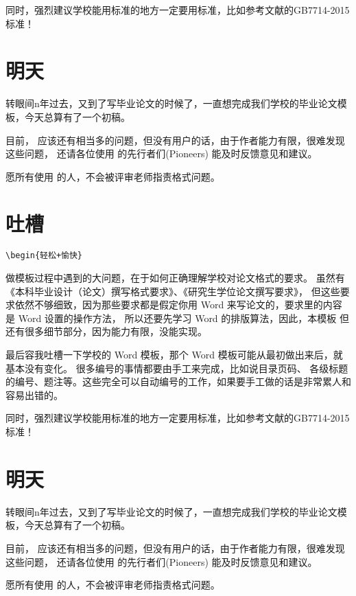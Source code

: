 同时，强烈建议学校能用标准的地方一定要用标准，比如参考文献的GB7714-2015标准！

\section{明天}

转眼间n年过去，又到了写毕业论文的时候了，一直想完成我们学校的毕业论文模板，今天总算有了一个初稿。

目前， \nwafuthesis{} 应该还有相当多的问题，但没有用户的话，由于作者能力有限，很难发现这些问题，
还请各位使用 \nwafuthesis{} 的先行者们(Pioneers) 能及时反馈意见和建议。

愿所有使用 \nwafuthesis{} 的人，不会被评审老师指责格式问题。

\section{吐槽}

\verb!\begin{轻松+愉快}!

做模板过程中遇到的大问题，在于如何正确理解学校对论文格式的要求。
虽然有《本科毕业设计（论文）撰写格式要求》、《研究生学位论文撰写要求》，
但这些要求依然不够细致，因为那些要求都是假定你用 Word 来写论文的，要求里的内容是 Word 设置的操作方法，
所以还要先学习 Word 的排版算法，因此，本模板
但还有很多细节部分，因为能力有限，没能实现。

最后容我吐槽一下学校的 Word 模板，那个 Word 模板可能从最初做出来后，就基本没有变化。
很多编号的事情都要由手工来完成，比如说目录页码、
各级标题的编号、题注等。这些完全可以自动编号的工作，如果要手工做的话是非常累人和容易出错的。

同时，强烈建议学校能用标准的地方一定要用标准，比如参考文献的GB7714-2015标准！

\section{明天}

转眼间n年过去，又到了写毕业论文的时候了，一直想完成我们学校的毕业论文模板，今天总算有了一个初稿。

目前， \nwafuthesis{} 应该还有相当多的问题，但没有用户的话，由于作者能力有限，很难发现这些问题，
还请各位使用 \nwafuthesis{} 的先行者们(Pioneers) 能及时反馈意见和建议。

愿所有使用 \nwafuthesis{} 的人，不会被评审老师指责格式问题。


